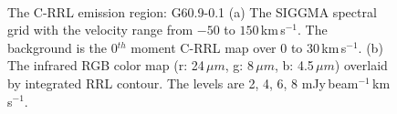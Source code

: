 \documentclass[manuscript]{aastex61}
\newcommand{\kms}{\,km\,s$^{-1}$}
\newcommand{\um}{\mu m}
\begin{document}
\begin{figure}[H]
	\centering
	\\ 
	\caption{The C-RRL emission region: G60.9-0.1
	(a) The SIGGMA spectral grid with the velocity range from $-50$ to $150$\kms.
	The background is the 0$^{th}$ moment C-RRL map over $0$ to $30$\kms.
	(b) The infrared RGB color map (r: 24\,$\um$, g: 8\,$\um$, b: 4.5\,$\um$) overlaid by integrated RRL contour.
	The levels are 2, 4, 6, 8 mJy\,beam$^{-1}$\kms.}
	\label{fig_crrl-g609}
\end{figure}
\end{document}
